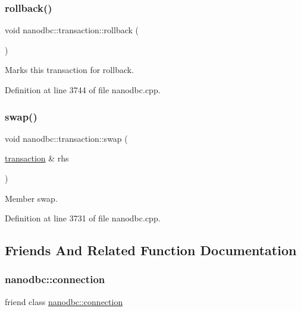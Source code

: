 \subsubsection{\texorpdfstring{rollback()}{rollback()}}
{\footnotesize\ttfamily void nanodbc\+::transaction\+::rollback (\begin{DoxyParamCaption}{ }\end{DoxyParamCaption})\hspace{0.3cm}{\ttfamily [noexcept]}}



Marks this transaction for rollback. 



Definition at line 3744 of file nanodbc.\+cpp.

\mbox{\label{classnanodbc_1_1transaction_ada0f4ab08a0fb530e904306f3eceb32c}} 
\subsubsection{\texorpdfstring{swap()}{swap()}}
{\footnotesize\ttfamily void nanodbc\+::transaction\+::swap (\begin{DoxyParamCaption}\item[{\mbox{\hyperlink{classnanodbc_1_1transaction}{transaction}} \&}]{rhs }\end{DoxyParamCaption})\hspace{0.3cm}{\ttfamily [noexcept]}}



Member swap. 



Definition at line 3731 of file nanodbc.\+cpp.



\subsection{Friends And Related Function Documentation}
\mbox{\label{classnanodbc_1_1transaction_a0b889d1aff4853b8d941bad4f0e1e9fc}} 
\subsubsection{\texorpdfstring{nanodbc::connection}{nanodbc::connection}}
{\footnotesize\ttfamily friend class \mbox{\hyperlink{classnanodbc_1_1connection}{nanodbc\+::connection}}\hspace{0.3cm}{\ttfamily [friend]}}



